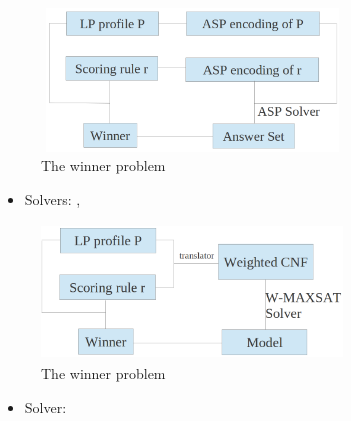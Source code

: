 {
	\begin{figure}
		\centering
		\includegraphics[width=8cm,height=3.8cm]{figs/LPTrees/asp_win_struct.png}
		\caption{The winner problem}
	\end{figure}

	\vspace{-0.45cm}

	\begin{itemize}
		\item Solvers: , 
	\end{itemize}
}

{
	\begin{figure}
		\centering
		\includegraphics[width=8cm,height=3.6cm]{figs/LPTrees/sat_win_struct.png}
		\caption{The winner problem}
	\end{figure}

	\vspace{-0.45cm}

	\begin{itemize}
		\item Solver: 
	\end{itemize}
}

